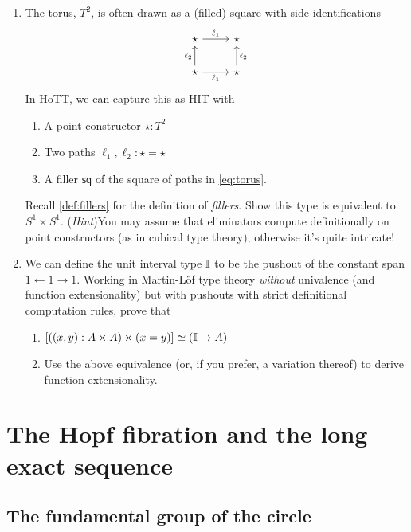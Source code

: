 \documentclass[10pt,oneside,leqno,openright]{memoir}
\begin{document}
\begin{enumerate}
\item The torus, $T^2$, is often drawn as a (filled) square with side identifications
\begin{equation}\label{eq:torus}
\begin{tikzcd}[ampersand replacement=\&]
	\star \& \star \\
	\star \& \star
	\arrow["{\ell_1}", from=1-1, to=1-2]
	\arrow["{\ell_2}", from=2-1, to=1-1]
	\arrow["{\ell_1}"', from=2-1, to=2-2]
	\arrow["{\ell_2}"', from=2-2, to=1-2]
\end{tikzcd}
\end{equation}
In HoTT, we can capture this as HIT with
\begin{enumerate}
\item[$\bullet$] A point constructor $\star : T^2$
\item[$\bullet$] Two paths $\ell_1,\ell_2 : \star = \star$
\item[$\bullet$] A filler $\mathsf{sq}$ of the square of paths in \eqref{eq:torus}.
\end{enumerate}
Recall \cref{def:fillers} for the definition of \emph{fillers}.
%
Show this type is equivalent to $S^1 \times S^1$.
%
  (\emph{Hint})\enspace You may assume that eliminators compute definitionally
  on point constructors (as in cubical type theory), otherwise it's quite
  intricate!

\item We can define the unit interval type $\mathbb{I}$ to be the pushout of the constant span $1 \leftarrow 1 \rightarrow 1$. Working in Martin-Löf type theory \emph{without} univalence (and function extensionality) but with pushouts with strict definitional computation rules, prove that
  \begin{enumerate}
  \item $ [((x, y) : A \times A) \times (x = y)] \simeq (\mathbb{I} \to A)$
  \item Use the above equivalence (or, if you prefer, a variation thereof) to derive function extensionality.
  \end{enumerate}

\end{enumerate}


\chapter[The Hopf fibration and the LES]{The Hopf fibration and the long exact sequence}

\section{The fundamental group of the circle}
\end{document}

